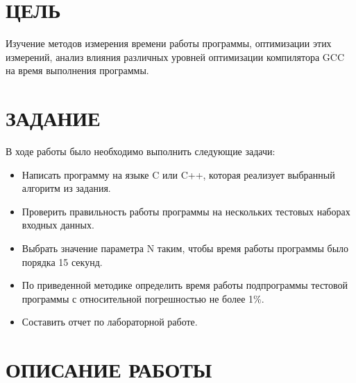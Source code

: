 \documentclass[12pt,a4paper]{article}
\numberwithin{subsection}{section}
\begin{document}
\tableofcontents

\newpage

\setcounter{page}{2}


\section{ЦЕЛЬ}
Изучение методов измерения времени работы программы, 
оптимизации этих измерений, анализ влияния различных 
уровней оптимизации компилятора GCC на время 
выполнения программы.

\section{ЗАДАНИЕ}
В ходе работы было необходимо выполнить следующие задачи:
\begin{itemize}
    \item Написать программу на языке C или C++, которая реализует выбранный алгоритм из задания.
    \item Проверить правильность работы программы на нескольких тестовых наборах входных данных.
    \item Выбрать значение параметра N таким, чтобы время работы программы было порядка 15 секунд.
    \item По приведенной методике определить время работы подпрограммы тестовой программы с 
    относительной погрешностью не более 1\%.
    \item Составить отчет по лабораторной работе.
\end{itemize}

\newpage


\section{ОПИСАНИЕ РАБОТЫ}
\end{document}

